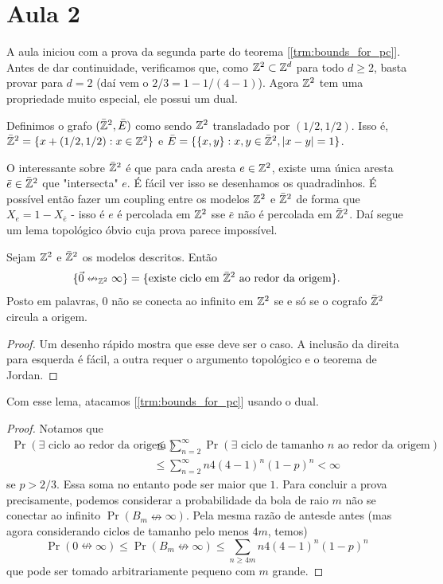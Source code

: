 \section{Aula 2}
A aula iniciou com a prova da segunda parte
do teorema [\ref{trm:bounds_for_pc}].
Antes de dar continuidade, verificamos que, como $\mathbb{Z}^2 \subset \mathbb{Z}^d$ para todo
$d \geq 2$, basta provar para $d = 2$ (daí vem o $2/3 = 1 - 1/(4-1)$). Agora
$\mathbb{Z}^2$ tem uma propriedade muito especial, ele possui um
dual.

\begin{definition}
	Definimos o grafo $(\bar{\mathbb{Z}}^2, \bar{E})$ como sendo $\mathbb{Z}^2$ transladado
	por $(1/2, 1/2)$. Isso é, $\bar{\mathbb{Z}}^2 = \{x + (1/2, 1/2) : x \in \mathbb{Z}^2\}$ e
	$\bar{E} = \{\{x,y\} : x,y \in \bar{\mathbb{Z}}^2, |x-y| = 1\}$.
\end{definition}

O interessante sobre $\bar{\mathbb{Z}}^2$ é que para cada aresta $e \in \mathbb{Z}^2$,
existe uma única
aresta $\bar{e} \in \bar{\mathbb{Z}}^2$ que "intersecta" $e$. É fácil ver
isso se desenhamos os quadradinhos.
É possível então fazer um coupling entre os modelos $\mathbb{Z}^2$ e
$\bar{\mathbb{Z}}^2$ de forma que
$X_e = 1 - X_{\bar{e}}$ - isso é $e$ é percolada em $\mathbb{Z}^2$ sse
$\bar{e}$ não é percolada em $\bar{\mathbb{Z}}^2$. Daí segue um lema
topológico óbvio
cuja prova parece impossível.

\begin{lemma}
	Sejam $\mathbb{Z}^2$ e $\bar{\mathbb{Z}}^2$ os modelos descritos. Então
	\[
		\{\vec{0} \nleftrightarrow_{\mathbb{Z}^2} \infty\} = \{\text{existe ciclo
		em } \bar{\mathbb{Z}}^2 \text{ ao redor da origem}\}.
	\]
	Posto em palavras, $0$ não se conecta ao infinito em $\mathbb{Z}^2$ se e só se o
	cografo $\bar{\mathbb{Z}}^2$ circula a origem.
\end{lemma}
\begin{proof}
	Um desenho rápido mostra que esse deve ser o caso. A inclusão da
	direita para esquerda é fácil,
	a outra requer o argumento topológico e o teorema de Jordan.
\end{proof}

Com esse lema, atacamos [\ref{trm:bounds_for_pc}] usando o dual.
\begin{proof}
	Notamos que
	\begin{align*}
		\Pr(\exists \text{ ciclo ao redor da origem}) &\leq \sum_{n =
		2}^{\infty} \Pr(\exists \text{ ciclo de tamanho } n \text{ ao redor
		da origem})\\
		&\leq \sum_{n = 2}^{\infty} n 4 (4-1)^n (1-p)^{n} < \infty
	\end{align*}
	se $p > 2/3$. Essa soma no entanto pode ser maior que $1$. Para
	concluir a prova precisamente, podemos considerar a probabilidade
	da bola de raio $m$ não se conectar ao infinito $\Pr(B_m
	\nleftrightarrow \infty)$.
	Pela mesma razão de antesde antes (mas agora considerando ciclos de
	tamanho pelo menos $4m$, temos)
	\[
		\Pr(0 \nleftrightarrow \infty) \leq \Pr(B_m \nleftrightarrow
		\infty) \leq \sum_{n \geq 4m} n4(4-1)^n(1-p)^n
	\]
	que pode ser tomado arbitrariamente pequeno com $m$ grande.
\end{proof}

